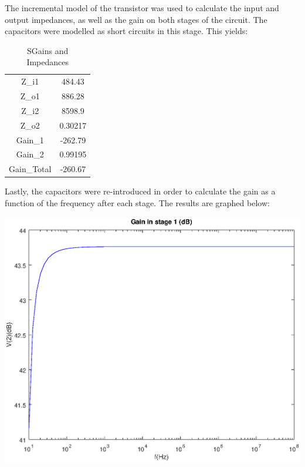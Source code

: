 The incremental model of the transistor was used to calculate the input and output impedances, as well as
the gain on both stages of the circuit. The capacitors were modelled as short circuits in this stage. This yields:

\begin{table}[H]
    \addtolength{\tabcolsep}{-4pt}
    \caption{SGains and Impedances}
    \vspace{-3mm}
    \begin{tabular}{|c|c|}
    \hline
    Z_{i1} &  484.43\\
    Z_{o1} &  886.28\\
    Z_{i2} &  8598.9\\
    Z_{o2} &  0.30217\\
    Gain_1 & -262.79\\
    Gain_2 &  0.99195\\
    Gain_{Total} & -260.67\\   
    \hline
    \end{tabular}
    \label{tab:Z_mat}
\end{table}

Lastly, the capacitors were re-introduced in order to calculate the gain as a function of the frequency after each stage.
The results are graphed below:

\includegraphics[width=1\linewidth]{vo1.eps}

